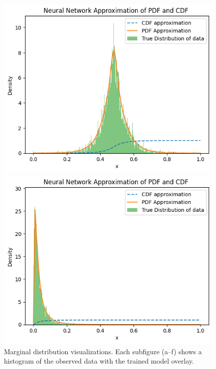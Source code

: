 \begin{figure}[h]
\vspace{1em}

\begin{minipage}{0.45\textwidth}
\centering
\includegraphics[width=\textwidth]{5ResultsDiscussion/pictures/MarginalTest/LaplaceHistogram.png}
\end{minipage}
\hfill
\begin{minipage}{0.45\textwidth}
\centering
\includegraphics[width=\textwidth]{5ResultsDiscussion/pictures/MarginalTest/LognormalHistogram.png}
\end{minipage}

\caption{Marginal distribution visualizations. Each subfigure (a--f) shows a histogram of the observed data with the trained model overlay.}
\label{fig:MarginalResults}
\end{figure}


